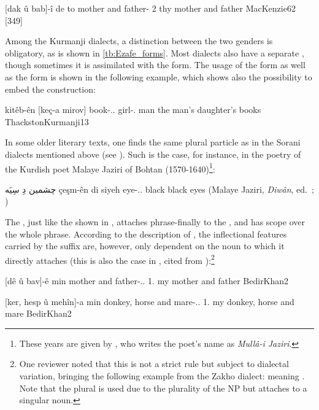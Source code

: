    {[dak û bab]-î de to}
   {mother and father-\ez{} \pl{} 2\sg}
   {thy mother and father}
   {MacKenzie}{62 {[349]}}
 
  Among the Kurmanji dialects, a distinction between the two genders is obligatory, as is shown in \vref{tb:Ezafe_forms}. Most dialects also have a separate \pl* \ez*, though sometimes it is assimilated with the \masc*  \sg* form. The usage of the \pl* form as well as the \fem* form is shown in the following example, which shows also the possibility to embed the \ez* construction:
  
  {kitêb-ên [keç-a mirov]}
  {book-\ez..\pl{} girl-\ez.\fem{} man}
	  {the man's daughter's books}
  {ThackstonKurmanji}{13}
  
  In some older literary texts, one finds the same plural particle as in the Sorani dialects mentioned above (see ). Such is the case, for instance, in the poetry of the Kurdish poet Malaye Jaziri of Bohtan (1570-1640)\footnote{These years are given by \citet[176]{IzadyKurds}, who writes the poet's name as \textit{Mullâ-i Jaziri}.}:
  
  {چشمین دِ سِيَه}
  {çeşm-ên di siyeh}
  {eye-\ez..\pl{} \pl{} black}
  {black eyes}
  {(Malaye Jaziri, \textit{Diwân}, ed.\ \cite[217]{Hartmann}; \cite[159, fn.\ 2]{MacKenzie})}
  
The \Kur \ez*, just like the \Sor \ez* shown in , attaches phrase-finally to the \prim, and has scope over the whole \prim phrase. According to the description of \citet{BedirKhan}, the inflectional features carried by the \Kur \ez* suffix are, however, only dependent on the noun to which it directly attaches (this is also the case in , cited from \citeauthor{ThackstonKurmanji}):\footnote{One reviewer noted that this is not a strict rule but subject to dialectal variation, bringing the following example from the Zakho dialect:  meaning . Note that the plural \ez* is used due to the plurality of the NP but attaches to a singular noun.} 



 {[dê û bav]-ê min}
 {mother and father-\ez..\masc{} 1\sg.\obl}
 {my mother and father}
 {BedirKhan}{2}
 
  {[ker, hesp û mehîn]-a min}
  {donkey, horse and mare-\ez..\fem{} 1\sg.\obl{}}
  {my donkey, horse and mare}
  {BedirKhan}{2}
 
